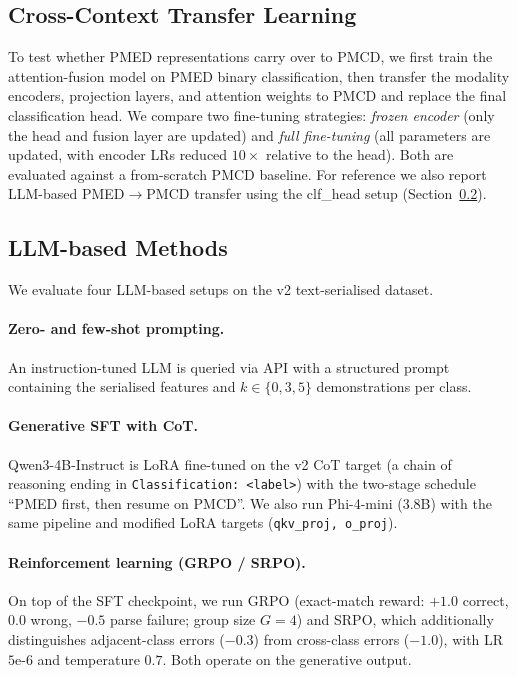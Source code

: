 \documentclass{article}
\begin{document}
\subsection{Cross-Context Transfer Learning}
To test whether PMED representations carry over to PMCD, we first train the attention-fusion model on PMED binary classification, then transfer the modality encoders, projection layers, and attention weights to PMCD and replace the final classification head. We compare two fine-tuning strategies: \emph{frozen encoder} (only the head and fusion layer are updated) and \emph{full fine-tuning} (all parameters are updated, with encoder LRs reduced $10\times$ relative to the head). Both are evaluated against a from-scratch PMCD baseline. For reference we also report LLM-based PMED$\to$PMCD transfer using the clf\_head setup (Section~\ref{sec:llm}).

\subsection{LLM-based Methods}
\label{sec:llm}

We evaluate four LLM-based setups on the v2 text-serialised dataset.

\paragraph{Zero- and few-shot prompting.} An instruction-tuned LLM is queried via API with a structured prompt containing the serialised features and $k \in \{0, 3, 5\}$ demonstrations per class.

\paragraph{Generative SFT with CoT.} Qwen3-4B-Instruct is LoRA fine-tuned on the v2 CoT target (a chain of reasoning ending in \texttt{Classification: <label>}) with the two-stage schedule ``PMED first, then resume on PMCD''. We also run Phi-4-mini (3.8B) with the same pipeline and modified LoRA targets (\texttt{qkv\_proj, o\_proj}).

\paragraph{Reinforcement learning (GRPO / SRPO).} On top of the SFT checkpoint, we run GRPO (exact-match reward: $+1.0$ correct, $0.0$ wrong, $-0.5$ parse failure; group size $G=4$) and SRPO, which additionally distinguishes adjacent-class errors ($-0.3$) from cross-class errors ($-1.0$), with LR $5\text{e-}6$ and temperature $0.7$. Both operate on the generative output.
\end{document}
